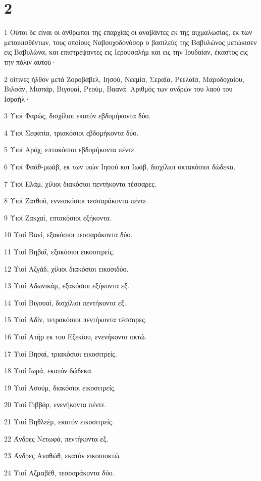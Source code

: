 \chapter{2}

\par 1 Ούτοι δε είναι οι άνθρωποι της επαρχίας οι αναβάντες εκ της αιχμαλωσίας, εκ των μετοικισθέντων, τους οποίους Ναβουχοδονόσορ ο βασιλεύς της Βαβυλώνος μετώκισεν εις Βαβυλώνα, και επιστρέψαντες εις Ιερουσαλήμ και εις την Ιουδαίαν, έκαστος εις την πόλιν αυτού·
\par 2 οίτινες ήλθον μετά Ζοροβάβελ, Ιησού, Νεεμία, Σεραΐα, Ρεελαΐα, Μαροδοχαίου, Βιλσάν, Μισπάρ, Βιγουαί, Ρεούμ, Βαανά. Αριθμός των ανδρών του λαού του Ισραήλ·
\par 3 Υιοί Φαρώς, δισχίλιοι εκατόν εβδομήκοντα δύο.
\par 4 Υιοί Σεφατία, τριακόσιοι εβδομήκοντα δύο.
\par 5 Υιοί Αράχ, επτακόσιοι εβδομήκοντα πέντε.
\par 6 Υιοί Φαάθ-μωάβ, εκ των υιών Ιησού και Ιωάβ, δισχίλιοι οκτακόσιοι δώδεκα.
\par 7 Υιοί Ελάμ, χίλιοι διακόσιοι πεντήκοντα τέσσαρες.
\par 8 Υιοί Ζατθού, εννεακόσιοι τεσσαράκοντα πέντε.
\par 9 Υιοί Ζακχαί, επτακόσιοι εξήκοντα.
\par 10 Υιοί Βανί, εξακόσιοι τεσσαράκοντα δύο.
\par 11 Υιοί Βηβαΐ, εξακόσιοι εικοσιτρείς.
\par 12 Υιοί Αζγάδ, χίλιοι διακόσιοι εικοσιδύο.
\par 13 Υιοί Αδωνικάμ, εξακόσιοι εξήκοντα εξ.
\par 14 Υιοί Βιγουαί, δισχίλιοι πεντήκοντα εξ.
\par 15 Υιοί Αδίν, τετρακόσιοι πεντήκοντα τέσσαρες.
\par 16 Υιοί Ατήρ εκ του Εζεκίου, ενενήκοντα οκτώ.
\par 17 Υιοί Βησαί, τριακόσιοι εικοσιτρείς.
\par 18 Υιοί Ιωρά, εκατόν δώδεκα.
\par 19 Υιοί Ασούμ, διακόσιοι εικοσιτρείς.
\par 20 Υιοί Γιββάρ, ενενήκοντα πέντε.
\par 21 Υιοί Βηθλεέμ, εκατόν εικοσιτρείς.
\par 22 Άνδρες Νετωφά, πεντήκοντα εξ.
\par 23 Άνδρες Αναθώθ, εκατόν εικοσιοκτώ.
\par 24 Υιοί Αζμαβέθ, τεσσαράκοντα δύο.
